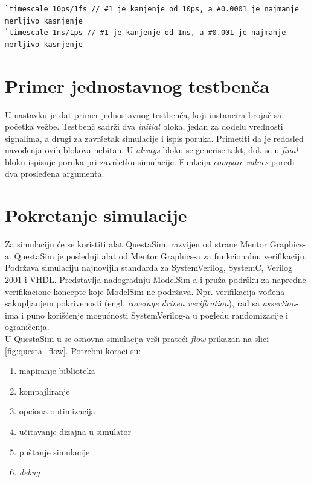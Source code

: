 \begin{lstlisting}
`timescale 10ps/1fs // #1 je kanjenje od 10ps, a #0.0001 je najmanje merljivo kasnjenje
`timescale 1ns/1ps // #1 je kanjenje od 1ns, a #0.001 je najmanje merljivo kasnjenje
\end{lstlisting}


\section{Primer jednostavnog testbenča}

U nastavku je dat primer jednostavnog testbenča, koji instancira brojač sa
početka vežbe. Testbenč sadrži dva \emph{initial} bloka, jedan za dodelu
vrednosti signalima, a drugi za završetak simulacije i ispis poruka. Primetiti
da je redosled navođenja ovih blokova nebitan. U \emph{always} bloku se generise
takt, dok se u \emph{final} bloku ispisuje poruka pri završetku simulacije.
Funkcija \emph{compare\(\_\)values} poredi dva prosleđena argumenta.




\section{Pokretanje simulacije}

Za simulaciju će se koristiti alat QuestaSim, razvijen od strane Mentor
Graphics-a. QuestaSim je poslednji alat od Mentor Graphics-a za funkcionalnu
verifikaciju. Podržava simulaciju najnovijih standarda za SystemVerilog,
SystemC, Verilog 2001 i VHDL. Predstavlja nadogradnju ModelSim-a i pruža podršku
za napredne verifikacione koncepte koje ModelSim ne podržava. Npr. verifikacija
vođena sakupljanjem pokrivenosti (engl. \emph{coverage driven verification}),
rad sa \emph{assertion}-ima i puno korišćenje mogućnosti SystemVerilog-a u
pogledu randomizacije i ograničenja.\\

U QuestaSim-u se osnovna simulacija vrši prateći \emph{flow} prikazan na slici
\ref{fig:questa_flow}.
Potrebni koraci su:
\begin{enumerate}
\item mapiranje biblioteka
\item kompajliranje
\item opciona optimizacija
\item učitavanje dizajna u simulator
\item puštanje simulacije
\item \emph{debug}
\end{enumerate}

